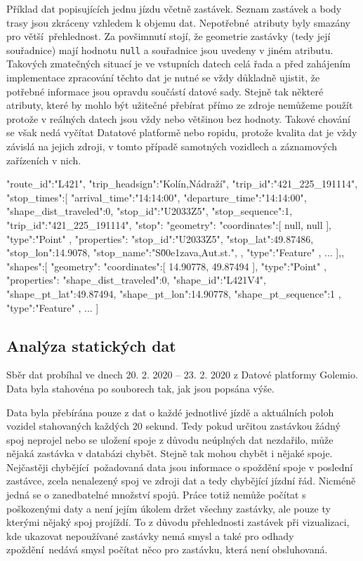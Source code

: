 \bigbreak

Příklad dat popisujících jednu jízdu včetně zastávek. Seznam zastávek a body trasy jsou zkráceny vzhledem k objemu dat. Nepotřebné atributy byly smazány pro větší přehlednost. Za povšimnutí stojí, že geometrie zastávky (tedy její souřadnice) mají hodnotu \verb-null- a souřadnice jsou uvedeny v jiném atributu. Takových zmatečných situací je ve vstupních datech celá řada a před zahájením implementace zpracování těchto dat je nutné se vždy důkladně ujistit, že potřebné informace jsou opravdu součástí datové sady. Stejně tak některé atributy, které by mohlo být užitečné přebírat přímo ze zdroje nemůžeme použít protože v reálných datech jsou vždy nebo většinou bez hodnoty. Takové chování se však nedá vyčítat Datatové platformě nebo \gls{ropid}u, protože kvalita dat je vždy závislá na jejich zdroji, v tomto případě samotných vozidlech a záznamových zařízeních v nich.

\begin{code}[frame=none]
"route_id":"L421",
"trip_headsign":"Kolín,Nádraží",
"trip_id":"421_225_191114",
"stop_times":[{
  "arrival_time":"14:14:00",
  "departure_time":"14:14:00",
  "shape_dist_traveled":0,
  "stop_id":"U2033Z5",
  "stop_sequence":1,
  "trip_id":"421_225_191114",
  "stop":{
    "geometry":{
      "coordinates":[
        null,
        null
      ],
      "type":"Point"
    },
    "properties":{
      "stop_id":"U2033Z5",
      "stop_lat":49.87486,
      "stop_lon":14.9078,
      "stop_name":"S\u00e1zava,Aut.st.",
    },
    "type":"Feature"
  },
  ...
],},
"shapes":[{
  "geometry":{
    "coordinates":[
      14.90778,
      49.87494
    ],
    "type":"Point"
  },
  "properties":{
    "shape_dist_traveled":0,
    "shape_id":"L421V4",
    "shape_pt_lat":49.87494,
    "shape_pt_lon":14.90778,
    "shape_pt_sequence":1
  },
  "type":"Feature"
},
...
]

\end{code}

\subsection{Analýza statických dat}

Sběr dat probíhal ve dnech 20. 2. 2020 -- 23. 2. 2020 z Datové platformy Golemio. Data byla stahovéna po souborech tak, jak jsou popsána výše.

\bigbreak

Data byla přebírána pouze z dat o každé jednotlivé jízdě a aktuálních poloh vozidel stahovaných každých 20 sekund. Tedy pokud určitou zastávkou žádný spoj neprojel nebo se uložení spoje z důvodu neúplných dat nezdařilo, může nějaká zastávka v databázi chybět. Stejně tak mohou chybět i nějaké spoje. Nejčastěji chybějící požadovaná data jsou informace o spoždění spoje v poslední zastávce, zcela nenalezený spoj ve zdroji dat a tedy chybějící jízdní řád. Nicméně jedná se o zanedbatelné množství spojů. Práce totiž nemůže počítat s poškozenými daty a není jejím úkolem držet všechny zastávky, ale pouze ty kterými nějaký spoj projíždí. To z důvodu přehlednosti zastávek při vizualizaci, kde ukazovat nepoužívané zastávky nemá smysl a také pro odhady zpoždění nedává smysl počítat něco pro zastávku, která není obsluhovaná.


